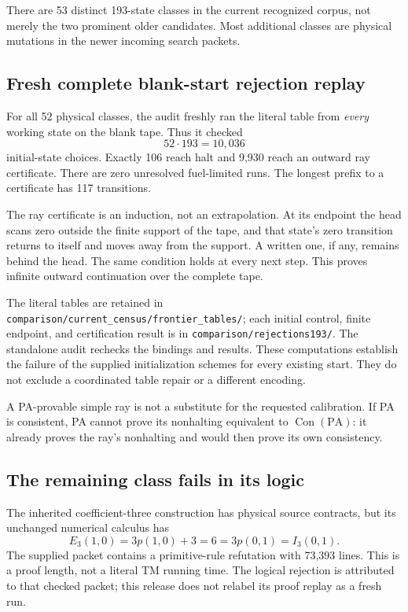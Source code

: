 \documentclass[10pt,letterpaper]{article}
\newcommand{\PA}{\mathrm{PA}}
\newcommand{\Con}{\operatorname{Con}}
\newcommand{\file}[1]{\texttt{\nolinkurl{#1}}}
\begin{document}
There are 53 distinct 193-state classes in the current recognized corpus,
not merely the two prominent older candidates. Most additional classes
are physical mutations in the newer incoming search packets.

\subsection{Fresh complete blank-start rejection replay}

For all 52 physical classes, the audit freshly ran the literal table from
\emph{every} working state on the blank tape. Thus it checked
\[
                 52\cdot193=10{,}036
\]
initial-state choices. Exactly 106 reach halt and 9,930 reach an outward
ray certificate. There are zero unresolved fuel-limited runs. The longest
prefix to a certificate has 117 transitions.

The ray certificate is an induction, not an extrapolation. At its
endpoint the head scans zero outside the finite support of the tape,
and that state's zero transition returns to itself and moves away from
the support. A written one, if any, remains behind the head.
The same condition holds at every next step. This proves infinite
outward continuation over the complete tape.

The literal tables are retained in
\file{comparison/current_census/frontier_tables/}; each initial control,
finite endpoint, and certification result is in
\file{comparison/rejections193/}. The standalone audit
rechecks the bindings and results. These computations establish the
failure of the supplied initialization schemes for every existing start.
They do not exclude a coordinated table repair or a different encoding.

A PA-provable simple ray is not a substitute for the requested
calibration. If PA is consistent, PA cannot prove its nonhalting
equivalent to $\Con(\PA)$: it already proves the ray's nonhalting and
would then prove its own consistency.

\subsection{The remaining class fails in its logic}

The inherited coefficient-three construction has physical source
contracts, but its unchanged numerical calculus has
\[
 E_3(1,0)=3p(1,0)+3=6=3p(0,1)=I_3(0,1).
\]
The supplied packet contains a primitive-rule refutation with 73,393
lines. This is a proof length, not a literal TM running time.
The logical rejection is attributed to that checked packet; this release
does not relabel its proof replay as a fresh run.
\end{document}
